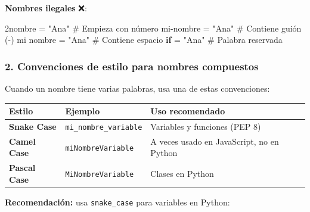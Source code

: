 \documentclass[
  doc,
  floatsintext,
  longtable,
  a4paper,
  nolmodern,
  notxfonts,
  notimes,
  12pt,
  colorlinks=true,linkcolor=blue,citecolor=blue,urlcolor=blue]{apa7}
\newenvironment{Shaded}{\begin{snugshade}}{\end{snugshade}}
\newcommand{\CommentTok}[1]{\textcolor[rgb]{0.37,0.37,0.37}{#1}}
\newcommand{\ControlFlowTok}[1]{\textcolor[rgb]{0.00,0.23,0.31}{\textbf{#1}}}
\newcommand{\DecValTok}[1]{\textcolor[rgb]{0.68,0.00,0.00}{#1}}
\newcommand{\ErrorTok}[1]{\textcolor[rgb]{0.68,0.00,0.00}{#1}}
\newcommand{\NormalTok}[1]{\textcolor[rgb]{0.00,0.23,0.31}{#1}}
\newcommand{\OperatorTok}[1]{\textcolor[rgb]{0.37,0.37,0.37}{#1}}
\newcommand{\StringTok}[1]{\textcolor[rgb]{0.13,0.47,0.30}{#1}}
\newcounter{none} %
\begin{document}
\textbf{Nombres ilegales} ❌:

\begin{Shaded}
\begin{Highlighting}[]
\DecValTok{2}\ErrorTok{nombre} \OperatorTok{=} \StringTok{"Ana"}       \CommentTok{\# Empieza con número}
\NormalTok{mi}\OperatorTok{{-}}\NormalTok{nombre }\OperatorTok{=} \StringTok{"Ana"}     \CommentTok{\# Contiene guión ({-})}
\NormalTok{mi nombre }\OperatorTok{=} \StringTok{"Ana"}     \CommentTok{\# Contiene espacio}
\ControlFlowTok{if} \OperatorTok{=} \StringTok{"Ana"}            \CommentTok{\# Palabra reservada}
\end{Highlighting}
\end{Shaded}

\subsubsection{2. Convenciones de estilo para nombres
compuestos}\label{convenciones-de-estilo-para-nombres-compuestos}

Cuando un nombre tiene varias palabras, usa una de estas convenciones:

{\def\LTcaptype{none} %
\begin{longtable}[]{@{}
  >{\raggedright\arraybackslash}p{}
  >{\raggedright\arraybackslash}p{}
  >{\raggedright\arraybackslash}p{}@{}}
\toprule\noalign{}
\begin{minipage}[b]{\linewidth}\raggedright
Estilo
\end{minipage} & \begin{minipage}[b]{\linewidth}\raggedright
Ejemplo
\end{minipage} & \begin{minipage}[b]{\linewidth}\raggedright
Uso recomendado
\end{minipage} \\
\midrule\noalign{}
\endhead
\bottomrule\noalign{}
\endlastfoot
\textbf{Snake Case} & \texttt{mi\_nombre\_variable} & Variables y
funciones (PEP 8) \\
\textbf{Camel Case} & \texttt{miNombreVariable} & A veces usado en
JavaScript, no en Python \\
\textbf{Pascal Case} & \texttt{MiNombreVariable} & Clases en Python \\
\end{longtable}
}

\textbf{Recomendación:} usa \texttt{snake\_case} para variables en
Python:
\end{document}
